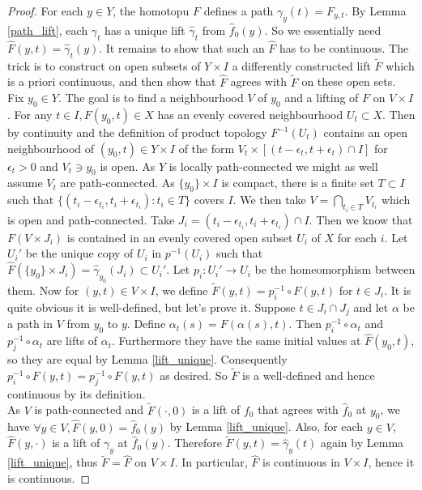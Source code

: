 \begin{proof}
    For each $y\in Y$, the homotopu $F$ defines a path $\gamma_y(t)=F_{y,t}$.
    By Lemma \ref{path_lift}, each $\gamma_t$ has a unique lift $\hat{\gamma}_t$ from $\hat{f}_0(y)$.
    So we essentially need $\hat{F}(y,t)=\hat{\gamma}_t(y)$.
    It remains to show that such an $\hat{F}$ has to be continuous.
    The trick is to construct on open subsets of $Y\times I$ a differently constructed lift $\tilde{F}$ which is a priori continuous, and then show that $\hat{F}$ agrees with $\tilde{F}$ on these open sets.
    Fix $y_0\in Y$.
    The goal is to find a neighbourhood $V$ of $y_0$ and a lifting of $F$ on $V\times I$.
    For any $t\in I,F(y_0,t)\in X$ has an evenly covered neighbourhood $U_t\subset X$.
    Then by continuity and the definition of product topology $F^{-1}(U_t)$ contains an open neighbourhood of $(y_0,t)\in Y\times I$ of the form $V_t\times[(t-\epsilon_t,t+\epsilon_t)\cap I]$ for $\epsilon_t>0$ and $V_t\ni y_0$ is open.
    As $Y$ is locally path-connected we might as well assume $V_t$ are path-connected.
    As $\{y_0\}\times I$ is compact, there is a finite set $T\subset I$ such that $\{(t_i-\epsilon_{t_i},t_i+\epsilon_{t_i}):t_i\in T\}$ covers $I$.
    We then take $V=\bigcap_{t_i\in T}V_{t_i}$ which is open and path-connected.
    Take $J_i=(t_i-\epsilon_{t_i},t_i+\epsilon_{t_i})\cap I$.
    Then we know that $F(V\times J_i)$ is contained in an evenly covered open subset $U_i$ of $X$ for each $i$.
    Let $U_i'$ be the unique copy of $U_i$ in $p^{-1}(U_i)$ such that $\hat{F}(\{y_0\}\times J_i)=\hat{\gamma}_{y_0}(J_i)\subset U_i'$.
    Let $p_i:U_i'\to U_i$ be the homeomorphism between them.
    Now for $(y,t)\in V\times I$, we define $\tilde{F}(y,t)=p_i^{-1}\circ F(y,t)$ for $t\in J_i$.
    It is quite obvious it is well-defined, but let's prove it.
    Suppose $t\in J_i\cap J_j$ and let $\alpha$ be a path in $V$ from $y_0$ to $y$.
    Define $\alpha_t(s)=F(\alpha(s),t)$.
    Then $p_i^{-1}\circ \alpha_t$ and $p_j^{-1}\circ\alpha_t$ are lifts of $\alpha_t$.
    Furthermore they have the same initial values at $\hat{F}(y_0,t)$, so they are equal by Lemma \ref{lift_unique}.
    Consequently $p_i^{-1}\circ F(y,t)=p_j^{-1}\circ F(y,t)$ as desired.
    So $\tilde{F}$ is a well-defined and hence continuous by its definition.\\
    As $V$ is path-connected and $\tilde{F}(\cdot,0)$ is a lift of $f_0$ that agrees with $\hat{f}_0$ at $y_0$, we have $\forall y\in V,\hat{F}(y,0)=\hat{f}_0(y)$ by Lemma \ref{lift_unique}.
    Also, for each $y\in V$, $\hat{F}(y,\cdot)$ is a lift of $\gamma_y$ at $\hat{f}_0(y)$.
    Therefore $\tilde{F}(y,t)=\hat{\gamma}_y(t)$ again by Lemma \ref{lift_unique}, thus $\tilde{F}=\hat{F}$ on $V\times I$.
    In particular, $\hat{F}$ is continuous in $V\times I$, hence it is continuous.
\end{proof}
